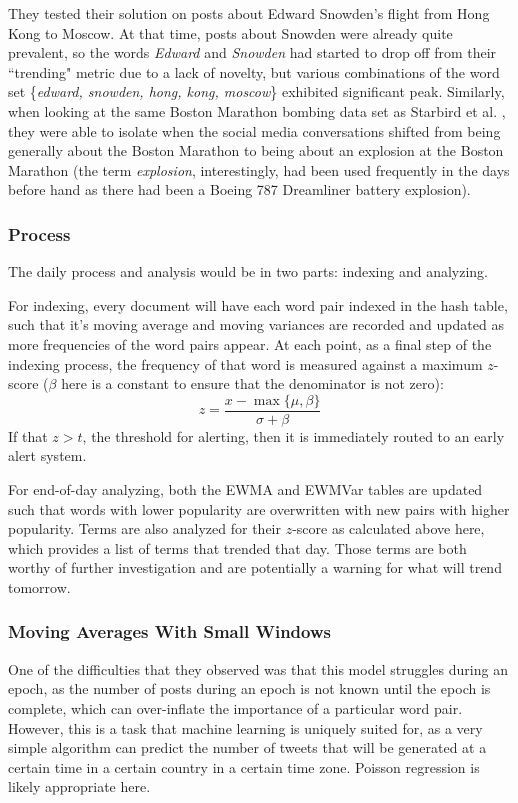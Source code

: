 \documentclass[preprint,review,12pt]{elsarticle}
\begin{document}
They tested their solution on posts about Edward Snowden's flight from Hong Kong to Moscow. At that time, posts about Snowden were already quite prevalent, so the words \textit{Edward} and \textit{Snowden} had started to drop off from their ``trending" metric due to a lack of novelty, but various combinations of the word set \{\textit{edward, snowden, hong, kong, moscow}\} exhibited significant peak. Similarly, when looking at the same Boston Marathon bombing data set as Starbird et al. \cite{starbird2014rumors}, they were able to isolate when the social media conversations shifted from being generally about the Boston Marathon to being about an explosion at the Boston Marathon (the term \textit{explosion}, interestingly, had been used frequently in the days before hand as there had been a Boeing 787 Dreamliner battery explosion).

\subsubsection{Process}
The daily process and analysis would be in two parts: indexing and analyzing.

For indexing, every document will have each word pair indexed in the hash table, such that it's moving average and moving variances are recorded and updated as more frequencies of the word pairs appear. At each point, as a final step of the indexing process, the frequency of that word is measured against a maximum $z$-score ($\beta$ here is a constant to ensure that the denominator is not zero):
\begin{equation}
    z = \frac{x-\max\{\mu, \beta\}}{\sigma + \beta}
\end{equation}
If that $z > t$, the threshold for alerting, then it is immediately routed to an early alert system.

For end-of-day analyzing, both the EWMA and EWMVar tables are updated such that words with lower popularity are overwritten with new pairs with higher popularity. Terms are also analyzed for their $z$-score as calculated above here, which provides a list of terms that trended that day. Those terms are both worthy of further investigation and are potentially a warning for what will trend tomorrow.

\subsubsection{Moving Averages With Small Windows}
One of the difficulties that they observed was that this model struggles during an epoch, as the number of posts during an epoch is not known until the epoch is complete, which can over-inflate the importance of a particular word pair. However, this is a task that machine learning is uniquely suited for, as a very simple algorithm can predict the number of tweets that will be generated at a certain time in a certain country in a certain time zone. Poisson regression is likely appropriate here.
\end{document}
